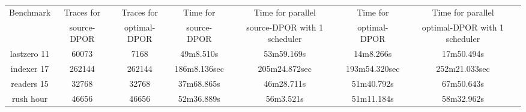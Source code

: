 \begin{center}
\begin{tabular}{ |c|c|c|c|c|c|c| }
\hline
Benchmark & Traces for& Traces for & Time for& Time for parallel& Time for& Time for parallel \\
 & source-DPOR & optimal-DPOR & source-DPOR & source-DPOR with 1 scheduler & optimal-DPOR & optimal-DPOR with 1 scheduler \\
\hline \hline
lastzero 11 & 60073 & 7168 & 49m8.510s & 53m59.169s & 14m8.266s & 17m50.494s \\
\hline
indexer 17 & 262144 & 262144 & 186m8.136sec & 205m24.872sec & 193m54.320sec & 252m21.033sec \\
\hline
readers 15 &  32768 & 32768 & 37m68.865s & 46m28.711s  & 51m40.792s & 67m50.643s \\
\hline
rush hour &  46656 & 46656 & 52m36.889s &  56m3.521s & 51m11.184s &  58m32.962s \\
\hline
\end{tabular}
\end{center}
